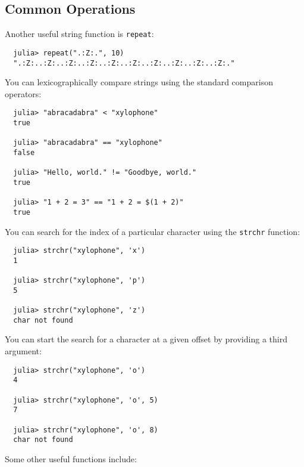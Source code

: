 \documentclass{article}
\begin{document}
\subsection{Common Operations}

Another useful string function is \verb|repeat|:
\begin{verbatim}
  julia> repeat(".:Z:.", 10)
  ".:Z:..:Z:..:Z:..:Z:..:Z:..:Z:..:Z:..:Z:..:Z:..:Z:."
\end{verbatim}
You can lexicographically compare strings using the standard comparison operators:
\begin{verbatim}
  julia> "abracadabra" < "xylophone"
  true

  julia> "abracadabra" == "xylophone"
  false

  julia> "Hello, world." != "Goodbye, world."
  true

  julia> "1 + 2 = 3" == "1 + 2 = $(1 + 2)"
  true
\end{verbatim}
You can search for the index of a particular character using the \verb|strchr| function:
\begin{verbatim}
  julia> strchr("xylophone", 'x')
  1

  julia> strchr("xylophone", 'p')
  5

  julia> strchr("xylophone", 'z')
  char not found
\end{verbatim}
You can start the search for a character at a given offset by providing a third argument:
\begin{verbatim}
  julia> strchr("xylophone", 'o')
  4

  julia> strchr("xylophone", 'o', 5)
  7

  julia> strchr("xylophone", 'o', 8)
  char not found
\end{verbatim}
Some other useful functions include:
\end{document}

